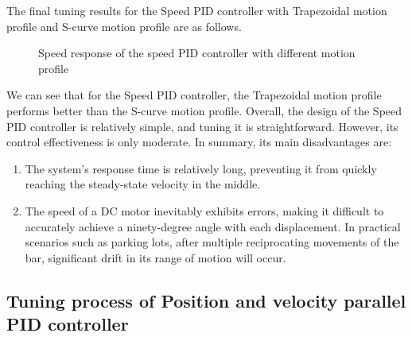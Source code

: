 \documentclass[11pt,a4paper]{article}%
\begin{document}
The final tuning results for the Speed PID controller with Trapezoidal motion profile and S-curve motion profile are as follows.
\begin{figure}[H]
    \centering
    \caption{Speed response of the speed PID controller with different motion profile}
    \label{SpeedKpMotion}
\end{figure}
We can see that for the Speed PID controller, the Trapezoidal motion profile performs better than the S-curve motion profile. Overall, the design of the Speed PID controller is relatively simple, and tuning it is straightforward. However, its control effectiveness is only moderate. In summary, its main disadvantages are:
\begin{enumerate}
    \item 
    The system's response time is relatively long, preventing it from quickly reaching the steady-state velocity in the middle.
    \item The speed of a DC motor inevitably exhibits errors, making it difficult to accurately achieve a ninety-degree angle with each displacement. In practical scenarios such as parking lots, after multiple reciprocating movements of the bar, significant drift in its range of motion will occur.
\end{enumerate}

\subsection{Tuning process of Position and velocity parallel PID controller}
\end{document}
